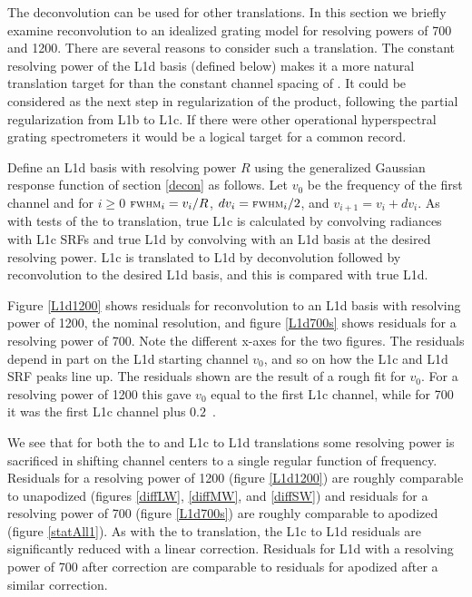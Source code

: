 \documentclass[10pt,twocolumn]{article}
\begin{document}

The {\airs} deconvolution can be used for other translations.  
In this section we briefly examine reconvolution to an idealized
grating model for resolving powers of 700 and 1200.  There are
several reasons to consider such a translation.  The constant
resolving power of the L1d basis (defined below) makes it a more
natural translation target for {\airs} than the constant channel
spacing of {\cris}.  It could be considered as the next step in
regularization of the {\airs} product, following the partial
regularization from L1b to L1c.  If there were other operational
hyperspectral grating spectrometers it would be a logical target 
for a common record.

Define an {\airs} L1d basis with resolving power $R$ using the
generalized Gaussian response function of section \ref{decon} as
follows.  Let $v_0$ be the frequency of the first channel and for
$i\ge0$ $\mbox{\small\textsc{fwhm}}_i = v_i / R$, $dv_i = \mbox{\small\textsc{fwhm}}_i / 2$, and $v_{i+1} =
v_i + dv_i$.  As with tests of the {\airs} to {\cris} translation,
true L1c is calculated by convolving {\kcarta} radiances with
{\airs} L1c SRFs and true L1d by convolving with an L1d basis at the
desired resolving power.  L1c is translated to L1d by deconvolution
followed by reconvolution to the desired L1d basis, and this is
compared with true L1d.

Figure \ref{L1d1200} shows residuals for reconvolution to an L1d
basis with resolving power of 1200, the nominal {\airs} resolution,
and figure \ref{L1d700s} shows residuals for a resolving power of
700.  Note the different x-axes for the two figures.  The residuals
depend in part on the L1d starting channel $v_0$, and so on how the
L1c and L1d SRF peaks line up.  The residuals shown are the result
of a rough fit for $v_0$.  For a resolving power of 1200 this gave
$v_0$ equal to the first L1c channel, while for 700 it was the first
L1c channel plus $0.2$~\wn.

We see that for both the {\airs} to {\cris} and L1c to L1d
translations some resolving power is sacrificed in shifting channel
centers to a single regular function of frequency.  Residuals for a
resolving power of 1200 (figure \ref{L1d1200}) are roughly
comparable to unapodized {\cris} (figures \ref{diffLW},
\ref{diffMW}, and \ref{diffSW}) and residuals for a resolving power
of 700 (figure \ref{L1d700s}) are roughly comparable to apodized
{\cris} (figure \ref{statAll1}).  As with the {\airs} to {\cris}
translation, the L1c to L1d residuals are significantly reduced with
a linear correction.  Residuals for L1d with a resolving power of
700 after correction are comparable to residuals for apodized
{\cris} after a similar correction.
\end{document}
